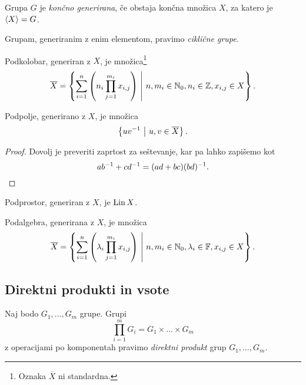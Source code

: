 \obvs

\begin{definicija}
Grupa $G$ je
\emph{končno generirana},
če obstaja končna množica $X$, za katero je $\left\langle X\right\rangle = G$.
\end{definicija}

\begin{opomba}
Grupam, generiranim z enim elementom, pravimo
\emph{ciklične grupe}.
\end{opomba}

\begin{trditev}
Podkolobar, generiran z $X$, je množica\footnote{Oznaka
$\overline{X}$ ni standardna.}
\[
\overline{X} =
\left\{\sum_{i=1}^n \left(n_i \prod_{j=1}^{m_i} x_{i,j}\right)~\middle\vert~n,m_i \in \mathbb{N}_0, n_i \in \mathbb{Z}, x_{i,j} \in X\right\}.
\]
\end{trditev}

\obvs

\begin{trditev}
Podpolje, generirano z $X$, je množica
\[
\left\{uv^{-1}~\middle\vert~u,v \in \overline{X}\right\}.
\]
\end{trditev}

\begin{proof}
Dovolj je preveriti zaprtost za seštevanje, kar pa lahko zapišemo
kot
\[
ab^{-1} + cd^{-1} = (ad + bc)(bd)^{-1}. \qedhere
\]
\end{proof}

\begin{trditev}
Podprostor, generiran z $X$, je $\operatorname{Lin} X$.
\end{trditev}

\obvs

\begin{trditev}
Podalgebra, generirana z $X$, je množica
\[
\overline{X} =
\left\{
\sum_{i=1}^n \left(\lambda_i \prod_{j=1}^{m_i} x_{i,j}\right)
~\middle\vert~
n,m_i \in \mathbb{N}_0, \lambda_i \in \mathbb{F}, x_{i,j} \in X
\right\}.
\]
\end{trditev}

\newpage

\subsection{Direktni produkti in vsote}


\begin{definicija}
Naj bodo $G_1, \dots, G_m$ grupe. Grupi
\[
\prod_{i=1}^m G_i = G_1 \times \dots \times G_m
\]
z operacijami po komponentah pravimo
\emph{direktni produkt}
grup $G_1, \dots, G_m$.
\end{definicija}

